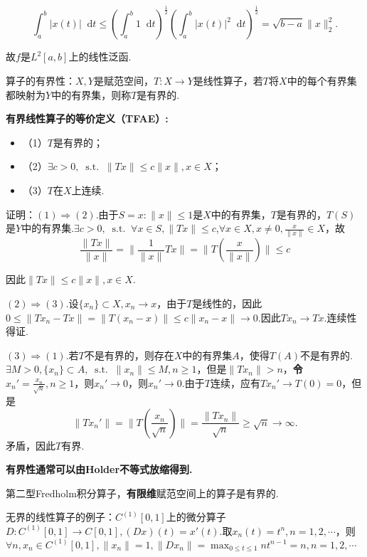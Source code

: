 \documentclass[bwprint, withoutpreface]{cumcmthesis}
\newcommand*{\st}{\mathop{}\!\mathrm{s.t.}\!\mathop{}}
\newcommand*{\dif}{\mathop{}\!\mathrm{d}}
\newcommand*{\norm}[1]{\| #1 \|}
\newcommand*{\nnorm}[2]{\| #1 \|_{#2}}
\begin{document}
\begin{equation*}
	\int_{a}^{b} |x(t)| \dif t \leqslant (\int_{a}^{b} 1 \dif t)^\frac{1}{2}(\int_{a}^{b}|x(t)|^2 \dif t)^\frac{1}{2} = \sqrt{b - a} \nnorm{x}{2}^2.
\end{equation*}

故$f$是$L^2[a, b]$上的线性泛函.

算子的有界性：$X, Y$是赋范空间，$T:X \to Y$是线性算子，若$T$将$X$中的每个有界集都映射为$Y$中的有界集，则称$T$是有界的.

\textbf{有界线性算子的等价定义（TFAE）:}
\begin{itemize}[itemindent=2em]
	\item （1）$T$是有界的；
	\item （2）$\exists c > 0, \st \norm{Tx} \leqslant c \norm{x}, x \in X$；
	\item （3）$T$在$X$上连续.
\end{itemize}

证明：$(1) \Rightarrow (2)$.由于$S = {x: \norm{x} \leqslant 1}$是$X$中的有界集，$T$是有界的，$T(S)$是$Y$中的有界集.$\exists c > 0, \st \forall x \in S, \norm{Tx} \leqslant c$,$\forall x \in X, x \neq 0, \frac{x}{\norm{x}} \in X$，故\[\frac{\norm{Tx}}{\norm{x}} = \norm{\frac{1}{\norm{x}} T x} = \norm{T(\frac{x}{\norm{x}})} \leqslant c\]

因此$\norm{Tx} \leqslant c \norm{x}, x \in X$.

$(2) \Rightarrow (3)$.设$\{x_n\} \subset X, x_n \to x$，由于$T$是线性的，因此$0 \leqslant \norm{Tx_n - Tx} = \norm{T(x_n - x)} \leqslant c \norm{x_n - x} \to 0.$因此$Tx_n \to Tx$.连续性得证.

$(3) \Rightarrow (1)$.若$T$不是有界的，则存在$X$中的有界集$A$，使得$T(A)$不是有界的.$\exists M > 0, \{x_n\} \subset A, \st \norm{x_n} \leqslant M, n \geqslant 1$，但是$\norm{Tx_n} > n$，\textbf{令}$x_n' = \frac{x_n}{\sqrt{n}}, n \geqslant 1$，则$x_n' \to 0$，则$x_n' \to 0$.由于$T$连续，应有$Tx_n' \to T(0) = 0$，但是
\begin{equation*}
	\norm{Tx_n'} = \norm{T(\frac{x_n}{\sqrt{n}})} = \frac{\norm{Tx_n}}{\sqrt{n}} \geqslant \sqrt{n} \to \infty.
\end{equation*}
矛盾，因此$T$有界.

\textbf{有界性通常可以由Holder不等式放缩得到.}

第二型Fredholm积分算子，\textbf{有限维}赋范空间上的算子是有界的.

无界的线性算子的例子：$C^{(1)}[0, 1]$上的微分算子$D: C^{(1)}[0, 1] \to C[0, 1], (Dx)(t) = x'(t)$.取$x_n(t) = t^n, n = 1, 2, \cdots$，则$\forall n, x_n \in C^{(1)}[0, 1], \norm{x_n} = 1, \norm{Dx_n} = \max_{0 \leqslant t \leqslant 1}{nt^{n - 1}} = n, n = 1, 2, \cdots$
\end{document}
